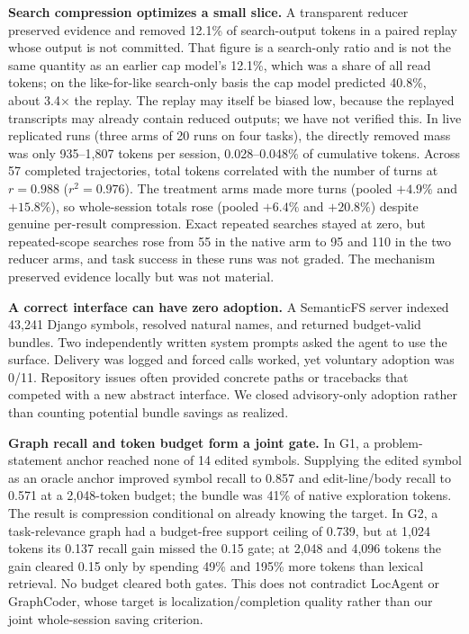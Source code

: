 \documentclass[10pt,twocolumn]{article}
\begin{document}
\textbf{Search compression optimizes a small slice.}  A transparent reducer preserved evidence and
removed 12.1\% of search-output tokens in a paired replay whose output is not committed.  That figure
is a search-only ratio and is not the same quantity as an earlier cap model's 12.1\%, which was a share
of all read tokens; on the like-for-like search-only basis the cap model predicted 40.8\%, about
3.4$\times$ the replay.  The
replay may itself be biased low, because the replayed transcripts may already contain reduced outputs;
we have not verified this.  In live replicated runs (three arms of 20 runs on four tasks), the directly
removed mass was only 935--1,807 tokens per session, 0.028--0.048\% of cumulative tokens.  Across 57
completed trajectories, total tokens correlated with the number of turns at $r=0.988$ ($r^2=0.976$).
The treatment arms made more turns (pooled $+4.9\%$ and $+15.8\%$), so whole-session totals rose
(pooled $+6.4\%$ and $+20.8\%$) despite genuine per-result compression.  Exact repeated searches stayed
at zero, but repeated-scope searches rose from 55 in the native arm to 95 and 110 in the two reducer
arms, and task success in these runs was not graded.  The mechanism preserved evidence locally but was
not material.

\textbf{A correct interface can have zero adoption.}  A SemanticFS server indexed 43,241 Django
symbols, resolved natural names, and returned budget-valid bundles.  Two independently written system
prompts asked the agent to use the surface.  Delivery was logged and forced calls worked, yet voluntary
adoption was 0/11.  Repository issues often provided concrete paths or tracebacks that competed with a
new abstract interface.  We closed advisory-only adoption rather than counting potential bundle
savings as realized.

\textbf{Graph recall and token budget form a joint gate.}  In G1, a problem-statement anchor reached
none of 14 edited symbols.  Supplying the edited symbol as an oracle anchor improved symbol recall to
0.857 and edit-line/body recall to 0.571 at a 2,048-token budget; the bundle was 41\% of native
exploration tokens.  The result is compression conditional on already knowing the target.  In G2, a
task-relevance graph had a budget-free support ceiling of 0.739, but at 1,024 tokens its 0.137 recall
gain missed the 0.15 gate; at 2,048 and 4,096 tokens the gain cleared 0.15 only by spending 49\% and
195\% more tokens than lexical retrieval.  No budget cleared both gates.  This does not contradict
LocAgent or GraphCoder, whose target is localization/completion quality rather than our joint
whole-session saving criterion.
\end{document}
